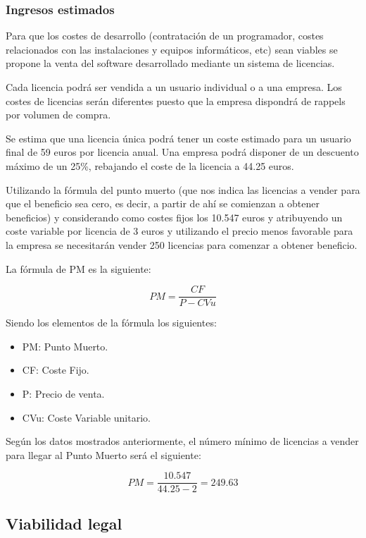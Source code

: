 \subsubsection{Ingresos estimados}
Para que los costes de desarrollo (contratación de un programador, costes relacionados con las instalaciones y equipos informáticos, etc) sean viables se propone la venta del software desarrollado mediante un sistema de licencias.

Cada licencia podrá ser vendida a un usuario individual o a una empresa. Los costes de licencias serán diferentes puesto que la empresa dispondrá de rappels por volumen de compra.

Se estima que una licencia única podrá tener un coste estimado para un usuario final de 59 euros por licencia anual. Una empresa podrá disponer de un descuento máximo de un 25\%, rebajando el coste de la licencia a 44.25 euros.

Utilizando la fórmula del punto muerto (que nos indica las licencias a vender para que el beneficio sea cero, es decir, a partir de ahí se comienzan a obtener beneficios) y considerando como costes fijos los 10.547 euros y atribuyendo un coste variable por licencia de 3 euros y utilizando el precio menos favorable para la empresa se necesitarán vender 250 licencias para comenzar a obtener beneficio.

La fórmula de PM es la siguiente:

\begin{equation*}
 	PM = \frac{CF}{P - CVu}
\end{equation*}

Siendo los elementos de la fórmula los siguientes:

\begin{itemize}
	\item PM: Punto Muerto.
	\item CF: Coste Fijo.
	\item P: Precio de venta.
	\item CVu: Coste Variable unitario.
\end{itemize}

Según los datos mostrados anteriormente, el número mínimo de licencias a vender para llegar al Punto Muerto será el siguiente:

\begin{equation*}
 	PM = \frac{10.547}{44.25 - 2} = 249.63
\end{equation*}

\subsection{Viabilidad legal}

